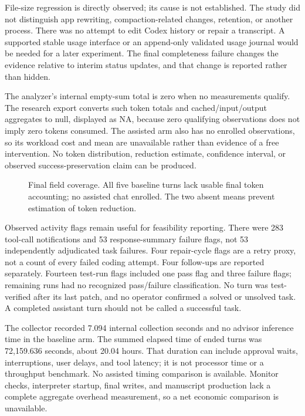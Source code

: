 \documentclass[11pt]{article}
\begin{document}
File-size regression is directly observed; its cause is not established. The study did not distinguish app rewriting, compaction-related changes, retention, or another process. There was no attempt to edit Codex history or repair a transcript. A supported stable usage interface or an append-only validated usage journal would be needed for a later experiment. The final completeness failure changes the evidence relative to interim status updates, and that change is reported rather than hidden.

The analyzer's internal empty-sum total is zero when no measurements qualify. The research export converts such token totals and cached/input/output aggregates to null, displayed as NA, because zero qualifying observations does not imply zero tokens consumed. The assisted arm also has no enrolled observations, so its workload cost and mean are unavailable rather than evidence of a free intervention. No token distribution, reduction estimate, confidence interval, or observed success-preservation claim can be produced.

\begin{figure}[htbp]
\centering
{}
\caption{Final field coverage. All five baseline turns lack usable final token accounting; no assisted chat enrolled. The two absent means prevent estimation of token reduction.}
\end{figure}
Observed activity flags remain useful for feasibility reporting. There were 283 tool-call notifications and 53 response-summary failure flags, not 53 independently adjudicated task failures. Four repair-cycle flags are a retry proxy, not a count of every failed coding attempt. Four follow-ups are reported separately. Fourteen test-run flags included one pass flag and three failure flags; remaining runs had no recognized pass/failure classification. No turn was test-verified after its last patch, and no operator confirmed a solved or unsolved task. A completed assistant turn should not be called a successful task.

The collector recorded 7.094 internal collection seconds and no advisor inference time in the baseline arm. The summed elapsed time of ended turns was 72,159.636 seconds, about 20.04 hours. That duration can include approval waits, interruptions, user delays, and tool latency; it is not processor time or a throughput benchmark. No assisted timing comparison is available. Monitor checks, interpreter startup, final writes, and manuscript production lack a complete aggregate overhead measurement, so a net economic comparison is unavailable.
\end{document}
